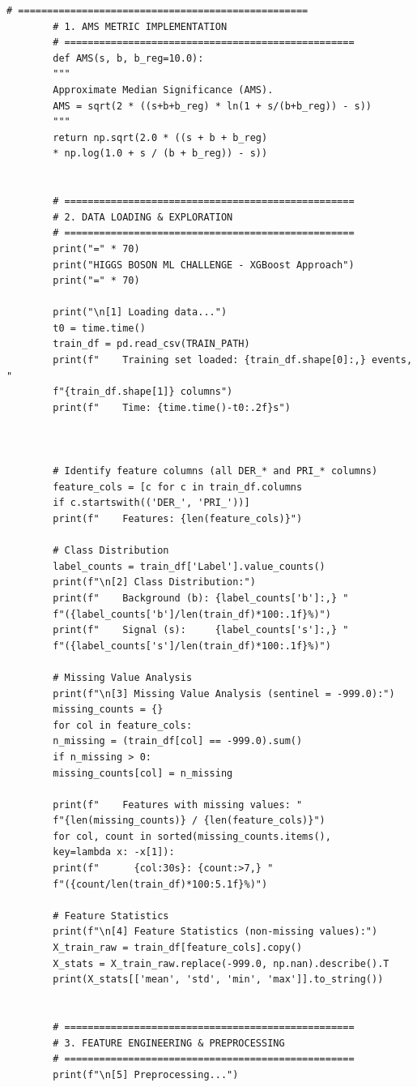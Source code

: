 \documentclass[12pt]{article}
\begin{document}
\begin{lstlisting}[caption={Main.py -- Complete implementation}]
		# ==================================================
		# 1. AMS METRIC IMPLEMENTATION
		# ==================================================
		def AMS(s, b, b_reg=10.0):
		"""
		Approximate Median Significance (AMS).
		AMS = sqrt(2 * ((s+b+b_reg) * ln(1 + s/(b+b_reg)) - s))
		"""
		return np.sqrt(2.0 * ((s + b + b_reg)
		* np.log(1.0 + s / (b + b_reg)) - s))
		
		
		# ==================================================
		# 2. DATA LOADING & EXPLORATION
		# ==================================================
		print("=" * 70)
		print("HIGGS BOSON ML CHALLENGE - XGBoost Approach")
		print("=" * 70)
		
		print("\n[1] Loading data...")
		t0 = time.time()
		train_df = pd.read_csv(TRAIN_PATH)
		print(f"    Training set loaded: {train_df.shape[0]:,} events, "
		f"{train_df.shape[1]} columns")
		print(f"    Time: {time.time()-t0:.2f}s")
		
		
		
		# Identify feature columns (all DER_* and PRI_* columns)
		feature_cols = [c for c in train_df.columns
		if c.startswith(('DER_', 'PRI_'))]
		print(f"    Features: {len(feature_cols)}")
		
		# Class Distribution
		label_counts = train_df['Label'].value_counts()
		print(f"\n[2] Class Distribution:")
		print(f"    Background (b): {label_counts['b']:,} "
		f"({label_counts['b']/len(train_df)*100:.1f}%)")
		print(f"    Signal (s):     {label_counts['s']:,} "
		f"({label_counts['s']/len(train_df)*100:.1f}%)")
		
		# Missing Value Analysis
		print(f"\n[3] Missing Value Analysis (sentinel = -999.0):")
		missing_counts = {}
		for col in feature_cols:
		n_missing = (train_df[col] == -999.0).sum()
		if n_missing > 0:
		missing_counts[col] = n_missing
		
		print(f"    Features with missing values: "
		f"{len(missing_counts)} / {len(feature_cols)}")
		for col, count in sorted(missing_counts.items(),
		key=lambda x: -x[1]):
		print(f"      {col:30s}: {count:>7,} "
		f"({count/len(train_df)*100:5.1f}%)")
		
		# Feature Statistics
		print(f"\n[4] Feature Statistics (non-missing values):")
		X_train_raw = train_df[feature_cols].copy()
		X_stats = X_train_raw.replace(-999.0, np.nan).describe().T
		print(X_stats[['mean', 'std', 'min', 'max']].to_string())
		
		
		# ==================================================
		# 3. FEATURE ENGINEERING & PREPROCESSING
		# ==================================================
		print(f"\n[5] Preprocessing...")
		

\end{lstlisting}
\end{document}
